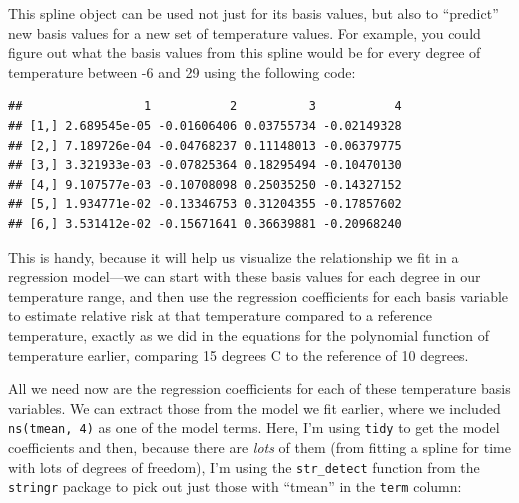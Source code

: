\documentclass[
]{book}
\newenvironment{Shaded}{\begin{snugshade}}{\end{snugshade}}
\newcommand{\AttributeTok}[1]{\textcolor[rgb]{0.77,0.63,0.00}{#1}}
\newcommand{\DecValTok}[1]{\textcolor[rgb]{0.00,0.00,0.81}{#1}}
\newcommand{\FunctionTok}[1]{\textcolor[rgb]{0.00,0.00,0.00}{#1}}
\newcommand{\NormalTok}[1]{#1}
\newcommand{\OtherTok}[1]{\textcolor[rgb]{0.56,0.35,0.01}{#1}}
\newcommand{\SpecialCharTok}[1]{\textcolor[rgb]{0.00,0.00,0.00}{#1}}
\begin{document}
This spline object can be used not just for its basis values, but also to ``predict'' new
basis values for a new set of temperature values. For example, you could figure out
what the basis values from this spline would be for every degree of temperature between
-6 and 29 using the following code:

\begin{Shaded}
\end{Shaded}

\begin{verbatim}
##                 1           2          3           4
## [1,] 2.689545e-05 -0.01606406 0.03755734 -0.02149328
## [2,] 7.189726e-04 -0.04768237 0.11148013 -0.06379775
## [3,] 3.321933e-03 -0.07825364 0.18295494 -0.10470130
## [4,] 9.107577e-03 -0.10708098 0.25035250 -0.14327152
## [5,] 1.934771e-02 -0.13346753 0.31204355 -0.17857602
## [6,] 3.531412e-02 -0.15671641 0.36639881 -0.20968240
\end{verbatim}

This is handy, because it will help us visualize the relationship we fit in a regression
model---we can start with these basis values for each degree in our temperature range, and
then use the regression coefficients for each basis variable to estimate relative risk
at that temperature compared to a reference temperature, exactly as we did in the equations
for the polynomial function of temperature earlier, comparing 15 degrees C to the reference
of 10 degrees.

All we need now are the regression coefficients for each of these temperature basis
variables. We can extract those from the model we fit earlier, where we included
\texttt{ns(tmean,\ 4)} as one of the model terms. Here, I'm using \texttt{tidy} to get the model
coefficients and then, because there are \emph{lots} of them (from fitting a spline for
time with lots of degrees of freedom), I'm using the \texttt{str\_detect} function from the
\texttt{stringr} package to pick out just those with ``tmean'' in the \texttt{term} column:
\end{document}
